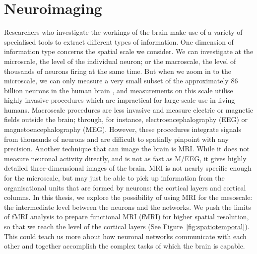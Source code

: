 \section*{Neuroimaging}
Researchers who investigate the workings of the brain make use of a variety of specialised tools to extract different types of information. One dimension of information type concerns the spatial scale we consider. We can investigate at the microscale, the level of the individual neuron; or the macroscale, the level of thousands of neurons firing at the same time. But when we zoom in to the microscale, we can only measure a very small subset of the approximately 86 billion neurons in the human brain \cite{Herculano-Houzel2009}, and measurements on this scale utilise highly invasive procedures which are impractical for large-scale use in living humans. Macroscale procedures are less invasive and measure electric or magnetic fields outside the brain; through, for instance, electroencephalography (EEG) or magnetoencephalography (MEG). However, these procedures integrate signals from thousands of neurons and are difficult to spatially pinpoint with any precision. Another technique that can image the brain is MRI. While it does not measure neuronal activity directly, and is not as fast as M/EEG, it gives highly detailed three-dimensional images of the brain. MRI is not nearly specific enough for the microscale, but may just be able to pick up information from the organisational units that are formed by neurons: the cortical layers and cortical columns. In this thesis, we explore the possibility of using MRI for the mesoscale: the intermediate level between the neurons and the networks. We push the limits of fMRI analysis to prepare functional MRI (fMRI) for higher spatial resolution, so that we reach the level of the cortical layers (See Figure~\ref{fig:spatiotemporal}). This could teach us more about how neuronal networks communicate with each other and together accomplish the complex tasks of which the brain is capable.


